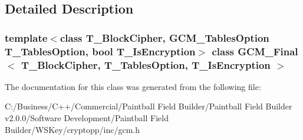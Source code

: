 \subsection{Detailed Description}
\subsubsection*{template$<$class T\_\-BlockCipher, GCM\_\-TablesOption T\_\-TablesOption, bool T\_\-IsEncryption$>$ class GCM\_\-Final$<$ T\_\-BlockCipher, T\_\-TablesOption, T\_\-IsEncryption $>$}



The documentation for this class was generated from the following file:\begin{DoxyCompactItemize}
\item 
C:/Business/C++/Commercial/Paintball Field Builder/Paintball Field Builder v2.0.0/Software Development/Paintball Field Builder/WSKey/cryptopp/inc/gcm.h\end{DoxyCompactItemize}
